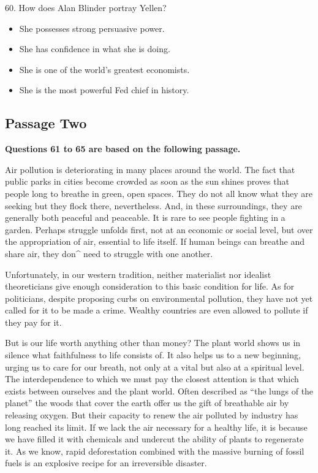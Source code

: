 \documentclass[UTF8,11pt]{ctexart}
\begin{document}
60. How does Alan Blinder portray Yellen?


\begin{itemize}[leftmargin=2em,itemsep=.2em,topsep=.4em]\item[A.] She possesses strong persuasive power.
\item[B.] She has confidence in what she is doing.
\item[C.] She is one of the world’s greatest economists.
\item[D.] She is the most powerful Fed chief in history.
\end{itemize}

\subsection*{\textbf{Passage Two}}


\textbf{Questions 61 to 65 are based on the following passage.}


Air pollution is deteriorating in many places around the world. The fact that public parks in cities become crowded as soon as the sun shines proves that people long to breathe in green, open spaces. They do not all know what they are seeking but they flock there, nevertheless. And, in these surroundings, they are generally both peaceful and peaceable. It is rare to see people fighting in a garden. Perhaps struggle unfolds first, not at an economic or social level, but over the appropriation of air, essential to life itself. If human beings can breathe and share air, they don\textasciicircum{} need to struggle with one another.


Unfortunately, in our western tradition, neither materialist nor idealist theoreticians give enough consideration to this basic condition for life. As for politicians, despite proposing curbs on environmental pollution, they have not yet called for it to be made a crime. Wealthy countries are even allowed to pollute if they pay for it.


But is our life worth anything other than money? The plant world shows us in silence what faithfulness to life consists of. It also helps us to a new beginning, urging us to care for our breath, not only at a vital but also at a spiritual level. The interdependence to which we must pay the closest attention is that which exists between ourselves and the plant world. Often described as “the lungs of the planet” the woods that cover the earth offer us the gift of breathable air by releasing oxygen. But their capacity to renew the air polluted by industry has long reached its limit. If we lack the air necessary for a healthy life, it is because we have filled it with chemicals and undercut the ability of plants to regenerate it. As we know, rapid deforestation combined with the massive burning of fossil fuels is an explosive recipe for an irreversible disaster.
\end{document}
